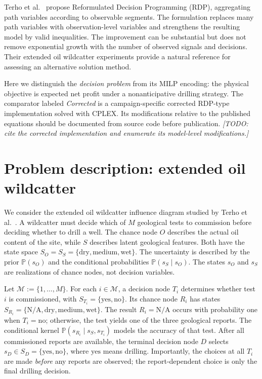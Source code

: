 \documentclass[11pt,a4paper]{article}
\newcommand{\Prob}{\mathbb{P}}
\newcommand{\calM}{\mathcal{M}}
\begin{document}
Terho et al.\ \cite{Terho2026} propose Reformulated Decision Programming (RDP), aggregating path variables according to observable segments. The formulation replaces many path variables with observation-level variables and strengthens the resulting model by valid inequalities. The improvement can be substantial but does not remove exponential growth with the number of observed signals and decisions. Their extended oil wildcatter experiments provide a natural reference for assessing an alternative solution method.

Here we distinguish the \emph{decision problem} from its MILP encoding: the physical objective is expected net profit under a nonanticipative drilling strategy. The comparator labeled \emph{Corrected} is a campaign-specific corrected RDP-type implementation solved with CPLEX. Its modifications relative to the published equations should be documented from source code before publication. {\color{BrickRed}\emph{[TODO: cite the corrected implementation and enumerate its model-level modifications.]}}


\section{Problem description: extended oil wildcatter}\label{sec:problem}
We consider the extended oil wildcatter influence diagram studied by
Terho et al.~\cite[Section~4.3, Fig.~2 and Table~5]{Terho2026}.  A
wildcatter must decide which of $M$ geological tests to commission
before deciding whether to drill a well.  The chance node $O$ describes
the actual oil content of the site, while $S$ describes latent geological
features.  Both have the state space
$S_O=S_S=\{\mathrm{dry},\mathrm{medium},\mathrm{wet}\}$.  The
uncertainty is described by the prior $\Prob(s_O)$ and the conditional
probabilities $\Prob(s_S\mid s_O)$.  The states $s_O$ and $s_S$ are
realizations of chance nodes, not decision variables.

Let $\calM:=\{1,\ldots,M\}$.  For each $i\in\calM$, a decision node
$T_i$ determines whether test $i$ is commissioned, with
$S_{T_i}=\{\mathrm{yes},\mathrm{no}\}$.  Its chance node $R_i$ has
states $S_{R_i}=\{\mathrm{N/A},\mathrm{dry},\mathrm{medium},
\mathrm{wet}\}$. The result $R_i=\mathrm{N/A}$ occurs with
probability one when $T_i=\mathrm{no}$; otherwise, the test yields one
of the three geological reports.  The conditional kernel
$\Prob(s_{R_i}\mid s_S,s_{T_i})$ models the accuracy of that test.
After all commissioned reports are available, the terminal decision
node $D$ selects $s_D\in S_D=\{\mathrm{yes},\mathrm{no}\}$, where
$\mathrm{yes}$ means drilling.  Importantly, the choices at all
$T_i$ are made \emph{before} any reports are observed; the report-dependent
choice is only the final drilling decision.
\end{document}
